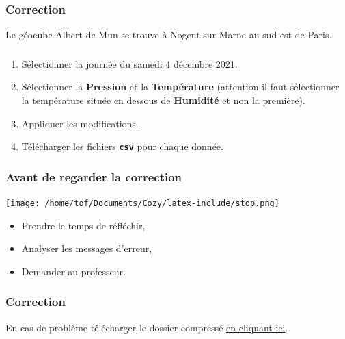 \documentclass[svgnames,11pt]{beamer}
\begin{document}
\begin{frame}
    \frametitle{Correction}

    Le géocube Albert de Mun se trouve à Nogent-sur-Marne au sud-est de Paris.

\end{frame}
\begin{frame}
    \frametitle{}

    \begin{activite}
        \begin{enumerate}
            \item Sélectionner la journée du samedi 4 décembre 2021.
            \item Sélectionner la \textbf{Pression} et la \textbf{Température} (attention il faut sélectionner la température située en dessous de \textbf{Humidité} et non la première).
            \item Appliquer les modifications.
            \item Télécharger les fichiers \textbf{\texttt{csv}} pour chaque donnée.
        \end{enumerate}
    \end{activite}

\end{frame}
\begin{frame}
    \frametitle{Avant de regarder la correction}
\begin{center}
    \centering
    \texttt{[image: /home/tof/Documents/Cozy/latex-include/stop.png]}
    \end{center}
{\Large
    \begin{itemize}
        \item Prendre le temps de réfléchir,
        \item Analyser les messages d'erreur,
        \item Demander au professeur.
    \end{itemize}
}
\end{frame}
\begin{frame}
    \frametitle{Correction}

    \begin{center}
        En cas de problème télécharger le dossier compressé
        \href{https://cviroulaud.github.io/seconde/donnees/geocube-mesures/scripts/donnees-4decembre.zip}{en cliquant ici}.
    \end{center}

\end{frame}
\end{document}
